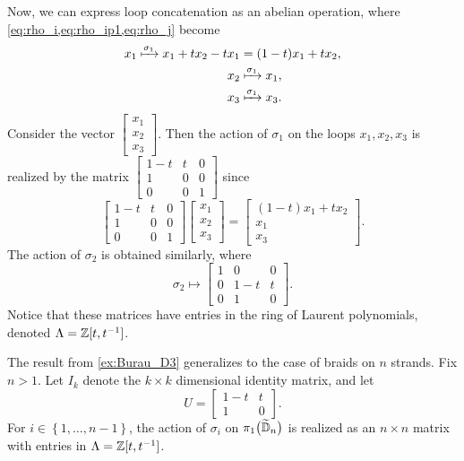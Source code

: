 \begin{example}
    Now, we can express loop concatenation as an abelian operation, where \cref{eq:rho_i,eq:rho_ip1,eq:rho_j} become
    \begin{align}
        x_1 \xmapsto{\sigma_1} x_1 + tx_2 - tx_1 &= (1-t)x_1 + tx_2, \\
        x_{2} &\xmapsto{\sigma_1} x_1, \\
        x_3 &\xmapsto{\sigma_1} x_3.
    \end{align}
    Consider the vector $\begin{bmatrix}
        x_1 \\ x_2 \\ x_3
    \end{bmatrix}$. Then the action of $\sigma_1$ on the loops $x_1,x_2,x_3$ is realized by the matrix $\begin{bmatrix}
        1-t & t & 0 \\ 1 & 0 & 0 \\ 0 & 0 & 1
    \end{bmatrix}$ since
    \begin{equation}
        \begin{bmatrix}
            1-t & t & 0 \\ 1 & 0 & 0 \\ 0 & 0 & 1
        \end{bmatrix}\begin{bmatrix}
            x_1 \\ x_2 \\ x_3
        \end{bmatrix} = \begin{bmatrix}
            (1-t)x_1 + tx_2 \\ x_1 \\ x_3
        \end{bmatrix}.
    \end{equation}
    The action of $\sigma_2$ is obtained similarly, where
    \begin{equation}
        \sigma_2 \mapsto \begin{bmatrix}
            1 & 0 & 0 \\ 0 & 1-t & t \\ 0 & 1 & 0
        \end{bmatrix}.
    \end{equation}
    Notice that these matrices have entries in the ring of Laurent polynomials, denoted $\Lambda=\mathbb{Z}[t,{ t }^{-1}]$.
\end{example}

The result from \cref{ex:Burau_D3} generalizes to the case of braids on $n$ strands. Fix $n>1$. Let $I_k$ denote the $k\times k$ dimensional identity matrix, and let
\begin{equation}
    U=\begin{bmatrix}
        1-t & t \\ 1 & 0
    \end{bmatrix}.
\end{equation} 
For $i\in\left\{ 1,\dots,n-1 \right\}$, the action of $\sigma_i$ on $\pi_1\bigl( \widetilde{\mathbb{D}}_n \bigr)$ is realized as an $n\times n$ matrix with entries in $\Lambda = \mathbb{Z}[t,{ t }^{-1}]$. 

